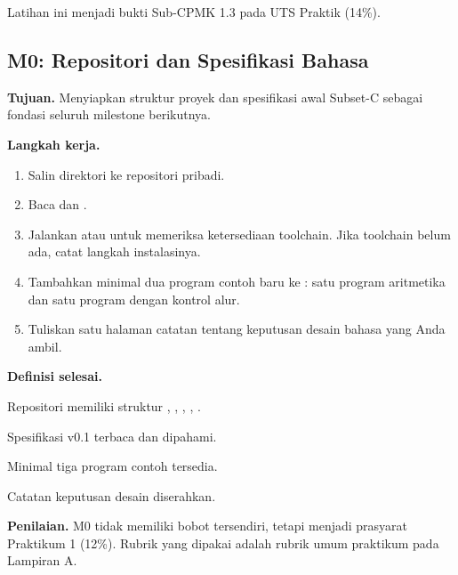 Latihan ini menjadi bukti Sub-CPMK 1.3 pada UTS Praktik (14\%).

\subsection*{M0: Repositori dan Spesifikasi Bahasa}
\textbf{Tujuan.} Menyiapkan struktur proyek dan spesifikasi awal
Subset-C sebagai fondasi seluruh milestone berikutnya.

\textbf{Langkah kerja.}
\begin{enumerate}[label=\arabic*.,leftmargin=*]
  \item Salin direktori  ke repositori pribadi.
  \item Baca  dan
        .
  \item Jalankan  atau  untuk memeriksa
        ketersediaan toolchain. Jika toolchain belum ada, catat
        langkah instalasinya.
  \item Tambahkan minimal dua program contoh baru ke
        : satu program aritmetika dan satu program
        dengan kontrol alur.
  \item Tuliskan satu halaman catatan tentang keputusan desain bahasa
        yang Anda ambil.
\end{enumerate}

\textbf{Definisi selesai.}
\begin{checklist}
  \item Repositori memiliki struktur , ,
        , , .
  \item Spesifikasi v0.1 terbaca dan dipahami.
  \item Minimal tiga program contoh tersedia.
  \item Catatan keputusan desain diserahkan.
\end{checklist}

\textbf{Penilaian.} M0 tidak memiliki bobot tersendiri, tetapi menjadi
prasyarat Praktikum 1 (12\%). Rubrik yang dipakai adalah rubrik umum
praktikum pada Lampiran A.
